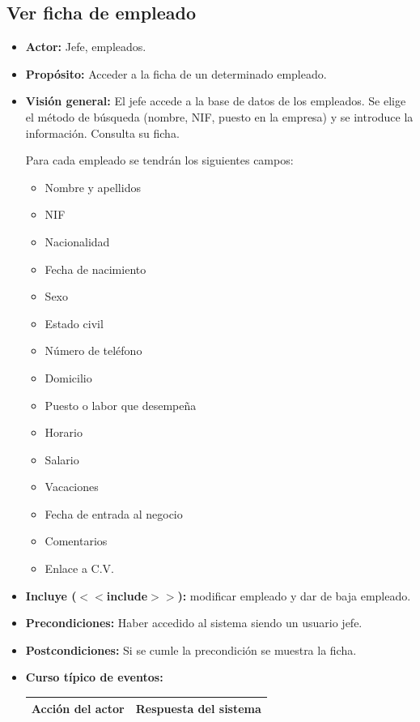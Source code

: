 \documentclass[spanish,a4paper,11pt, twoside]{report}	%
\begin{document}
	\subsection{Ver ficha de empleado}		
			\begin{itemize}
			\item \textbf{Actor:} Jefe, empleados.
			\item \textbf{Propósito: } Acceder a la ficha de un determinado empleado.
			\item \textbf{Visión general:} El jefe accede a la base de datos de los empleados. Se elige el método de búsqueda (nombre, NIF, puesto en la empresa) y se introduce la información. Consulta su ficha.

				Para cada empleado se tendrán los siguientes campos:
				\begin{itemize}
				\item 	 Nombre y apellidos
				\item 	 NIF
				\item 	 Nacionalidad
				\item 	Fecha de nacimiento
				\item 	Sexo
				\item 	Estado civil
				\item 	Número de teléfono
				\item 	Domicilio
				\item 	 Puesto o labor que desempeña
				\item 	 Horario
				\item 	 Salario
				\item 	 Vacaciones
				\item 	 Fecha de entrada al negocio
				\item 	 Comentarios
				\item 	Enlace a C.V.
				\end {itemize}
			\item \textbf{Incluye ($<<$include$>>$):} modificar empleado y dar de baja empleado.
			\item \textbf{Precondiciones:} Haber accedido al sistema siendo un usuario jefe.
			\item \textbf{Postcondiciones:} Si se cumle la precondición se muestra la ficha.
			\item \textbf{Curso típico de eventos:} 	\\
				\begin{tabular}{|p{6cm}||p{6cm}|}
				\hline
				\textbf{Acción del actor} & \textbf{Respuesta del sistema} \\ \hline \hline

\end{tabular}
\end{itemize}
\end{document}
